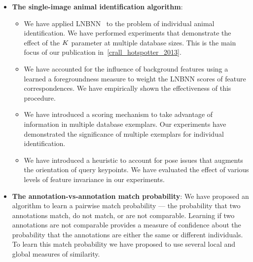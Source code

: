         \begin{itemize}

            \item \textbf{The single-image animal identification algorithm}:

                \begin{itemize}
                    \item We have applied LNBNN~\cite{mccann_local_2012} to
                      the problem of individual animal identification.
                    We have performed experiments that demonstrate the effect
                      of the $K$ parameter at multiple database sizes.
                    This is the main focus of our publication
                      in~\cref{crall_hotspotter_2013}.

                    \item We have accounted for the influence of background
                      features using a learned a foregroundness measure to
                      weight the LNBNN scores of feature correspondences.
                    We have empirically shown the effectiveness of this
                      procedure.

                    \item We have introduced a \name{} scoring mechanism to
                      take advantage of information in multiple database
                      exemplars.
                    Our experiments have demonstrated the significance of
                      multiple exemplars for individual identification.

                    \item 
                        We have introduced a heuristic to account for pose
                          issues that augments the orientation of query
                          keypoints.
                        We have evaluated the effect of various levels of
                          feature invariance in our experiments.
                \end{itemize}

           \item \textbf{The annotation-vs-annotation match probability}:
                We have proposed an algorithm to learn a pairwise match
                  probability --- the probability that two annotations match, do
                  not match, or are not comparable.
                Learning if two annotations are not comparable provides a
                  measure of confidence about the probability that the
                  annotations are either the same or different individuals.
                To learn this match probability we have proposed to use
                  several local and global measures of similarity.


\end{itemize}
